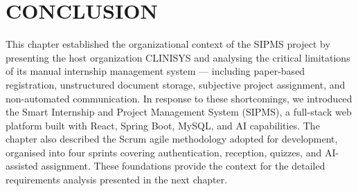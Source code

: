 \section{CONCLUSION}
This chapter established the organizational context of the SIPMS project by presenting the host organization CLINISYS and analysing the critical limitations of its manual internship management system — including paper-based registration, unstructured document storage, subjective project assignment, and non-automated communication. In response to these shortcomings, we introduced the Smart Internship and Project Management System (SIPMS), a full-stack web platform built with React, Spring Boot, MySQL, and AI capabilities. The chapter also described the Scrum agile methodology adopted for development, organised into four sprints covering authentication, reception, quizzes, and AI-assisted assignment. These foundations provide the context for the detailed requirements analysis presented in the next chapter.
